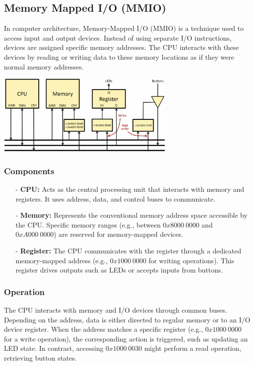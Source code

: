 \subsection{Memory Mapped I/O (MMIO)}

In computer architecture, Memory-Mapped I/O (MMIO) is a technique used to access input and output devices. Instead of using separate I/O instructions, devices are assigned specific memory addresses. The CPU interacts with these devices by reading or writing data to these memory locations as if they were normal memory addresses.

\begin{center}
    \includegraphics[width=0.65\textwidth]{chapters/chapter2b/images/complete.png}
\end{center}

\subsubsection*{Components}
\begin{itemize}
    \item[-] \textbf{CPU:} Acts as the central processing unit that interacts with memory and registers. It uses address, data, and control buses to communicate.
    \item[-] \textbf{Memory:} Represents the conventional memory address space accessible by the CPU. Specific memory ranges (e.g., between $0x8000\ 0000$ and $0xA000\ 0000$) are reserved for memory-mapped devices.
    \item[-] \textbf{Register:} The CPU communicates with the register through a dedicated memory-mapped address (e.g., $0x1000\ 0000$ for writing operations). This register drives outputs such as LEDs or accepts inputs from buttons.
\end{itemize}

\subsubsection*{Operation}
The CPU interacts with memory and I/O devices through common buses. Depending on the address, data is either directed to regular memory or to an I/O device register. When the address matches a specific register (e.g., $0x1000\ 0000$ for a write operation), the corresponding action is triggered, such as updating an LED state. In contrast, accessing $0x1000\ 0030$ might perform a read operation, retrieving button states.
